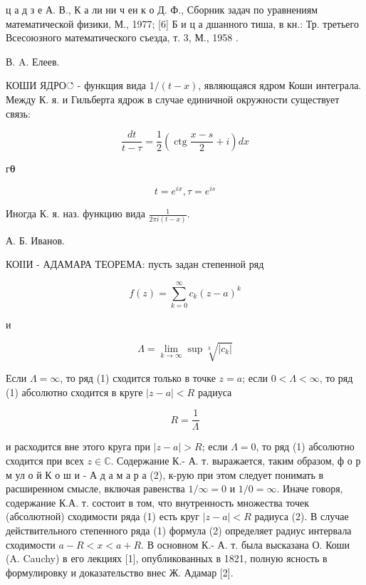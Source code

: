 \documentclass[10pt]{article}
\begin{document}
ц а д з е А. В., К а ли ни ч ен к о Д. Ф., Сборник задач по уравнениям математической физики, М., 1977; [6] Б и ц а дшанного тиша, в кн.: Тр. третьего Всесоюзного математического съезда, т. 3, М., 1958 .



В. A. Елеев.



КОШИ ЯДРО் - функщия вида $1 /(t-x)$, являющаяся ядром Коши интеграла. Между К. я. и Гильберта ядрож в случае единичной окружности существует связь:



\[

\frac{d t}{t-\tau}=\frac{1}{2}\left(\operatorname{ctg} \frac{x-s}{2}+i\right) d x

\]



$\mathbf{г} \boldsymbol{\theta}$



\[

t=e^{i x}, \tau=e^{i s}

\]



Иногда К. я. наз. функцию вида $\frac{1}{2 \pi i(t-x)}$.



А. Б. Иванов.



КОІІИ - АДАМАРА ТЕОРЕМА: пусть задан степенной ряд



\[

f(z)=\sum_{k=0}^{\infty} c_{k}(z-a)^{k}

\]



и



\[

\Lambda=\lim _{k \rightarrow \infty} \sup \sqrt[k]{\left|c_{k}\right|}

\]



Если $\Lambda=\infty$, то ряд (1) сходится только в точке $z=a$; если $0<\Lambda<\infty$, то ряд (1) абсолютно сходится в круге $|z-a|<R$ радиуса



\[

R=\frac{1}{\Lambda}

\]



и расходится вне этого круга при $|z-a|>R$; если $\Lambda=0$, то ряд (1) абсолютно сходится при всех $z \in \mathbb{C}$. Содержание К.- А. т. выражается, таким образом, ф о р м ул о й К о ш и - А д а м а р а (2), к-рую при этом следует понимать в расширенном смысле, включая равенства $1 / \infty=0$ и $1 / 0=\infty$. Иначе говоря, содержание К.А. т. состоит в том, что внутренность множества точек (абсолютной) сходимости ряда (1) есть круг $|z-a|<R$ радиуса (2). В случае действительного степенного ряда (1) формула (2) определяет радиус интервала сходимости $a-R<x<a+R$. В основном К.- А. т. была высказана О. Коши (A. Cauchy) в его лекциях [1], опубликованных в 1821, полную ясность в формулировку и доказательство внес Ж. Адамар [2].
\end{document}
